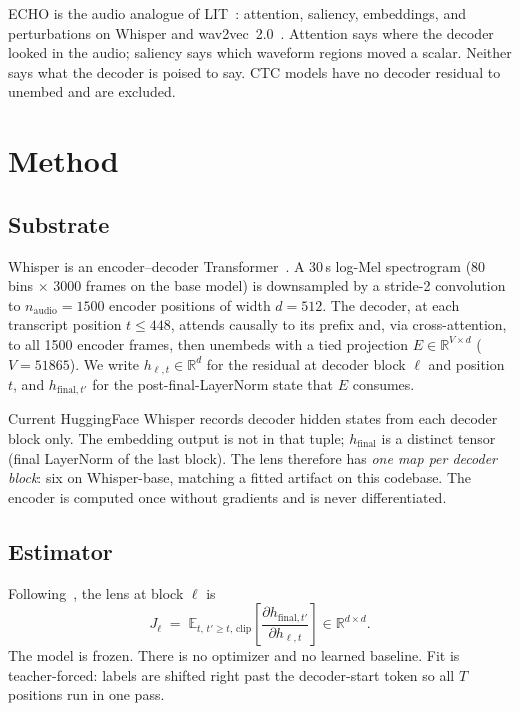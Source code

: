 \documentclass[conference]{IEEEtran}
\begin{document}
ECHO is the audio analogue of LIT~\cite{tenney2020lit}: attention, saliency, embeddings, and perturbations on Whisper and wav2vec~2.0~\cite{baevski2020wav2vec2}. Attention says where the decoder looked in the audio; saliency says which waveform regions moved a scalar. Neither says what the decoder is poised to say. CTC models have no decoder residual to unembed and are excluded.

\section{Method}

\subsection{Substrate}

Whisper is an encoder--decoder Transformer~\cite{vaswani2017attention}. A 30\,s log-Mel spectrogram (80 bins \(\times\) 3000 frames on the base model) is downsampled by a stride-2 convolution to \(n_{\mathrm{audio}}=1500\) encoder positions of width \(d=512\). The decoder, at each transcript position \(t\le 448\), attends causally to its prefix and, via cross-attention, to all 1500 encoder frames, then unembeds with a tied projection \(E\in\mathbb{R}^{V\times d}\) (\(V=51865\)). We write \(h_{\ell,t}\in\mathbb{R}^d\) for the residual at decoder block \(\ell\) and position \(t\), and \(h_{\mathrm{final},t'}\) for the post-final-LayerNorm state that \(E\) consumes.

Current HuggingFace Whisper records decoder hidden states from each decoder block only. The embedding output is not in that tuple; \(h_{\mathrm{final}}\) is a distinct tensor (final LayerNorm of the last block). The lens therefore has \emph{one map per decoder block}: six on Whisper-base, matching a fitted artifact on this codebase. The encoder is computed once without gradients and is never differentiated.

\subsection{Estimator}

Following~\cite{gurnee2026workspace}, the lens at block \(\ell\) is
\begin{equation}
J_\ell \;=\;
\mathbb{E}_{t,\,t'\ge t,\,\text{clip}}
\!\left[
\frac{\partial h_{\mathrm{final},t'}}{\partial h_{\ell,t}}
\right]
\in\mathbb{R}^{d\times d}.
\label{eq:J}
\end{equation}
The model is frozen. There is no optimizer and no learned baseline. Fit is teacher-forced: labels are shifted right past the decoder-start token so all \(T\) positions run in one pass.
\end{document}
